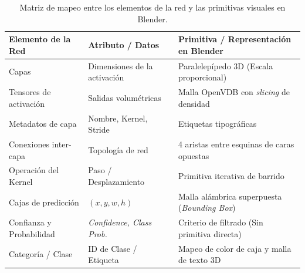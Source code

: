 \begin{table}[htbp]
    \centering
    \small
    \begin{tabular}{lll}
        \hline
        \textbf{Elemento de la Red} & \textbf{Atributo / Datos} & \textbf{Primitiva / Representación en Blender} \\ \hline
        Capas & Dimensiones de la activación & Paralelepípedo 3D (Escala proporcional) \\
        Tensores de activación & Salidas volumétricas & Malla OpenVDB con \textit{slicing} de densidad \\
        Metadatos de capa & Nombre, Kernel, Stride & Etiquetas tipográficas \\
        Conexiones inter-capa & Topología de red & 4 aristas entre esquinas de caras opuestas \\
        Operación del Kernel & Paso / Desplazamiento & Primitiva iterativa de barrido \\
        Cajas de predicción & $(x, y, w, h)$ & Malla alámbrica superpuesta (\textit{Bounding Box}) \\
        Confianza y Probabilidad & \textit{Confidence, Class Prob.} & Criterio de filtrado (Sin primitiva directa) \\
        Categoría / Clase & ID de Clase / Etiqueta & Mapeo de color de caja y malla de texto 3D \\ \hline
    \end{tabular}
    \caption{Matriz de mapeo entre los elementos de la red y las primitivas visuales en Blender.}
    \label{tab:mapeo_visual}
\end{table}